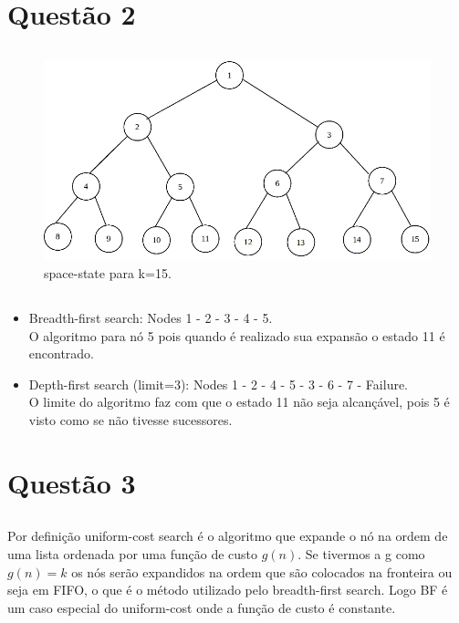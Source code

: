 \documentclass[a4paper,12pt]{article}
\begin{document}
\section{Questão 2}
\subsection{}
\begin{figure}[h!]
\includegraphics[width=\linewidth]{state1.jpg}
  \caption{space-state para k=15.}
  \label{fig:state1}
\end{figure} 
\subsection{}
\begin{itemize}
\item Breadth-first search: Nodes 1 - 2 - 3 - 4 - 5. \\
O algoritmo para nó 5 pois quando é realizado sua expansão o estado 11 é encontrado.
\item Depth-first search (limit=3): Nodes  1 - 2 - 4 - 5 - 3 - 6 - 7 - Failure.\\
O limite do algoritmo faz com que o estado 11 não seja alcançável, pois 5 é visto como se não tivesse sucessores.  
\end{itemize}
\section{Questão 3}
\subsection{}
Por definição uniform-cost search é o algoritmo que expande o nó na ordem de uma lista ordenada por uma função de custo $g(n)$. Se tivermos a g como $g(n)=k$ os nós serão expandidos na ordem que são colocados na fronteira ou seja em FIFO, o que é o método utilizado pelo breadth-first search. Logo BF é um caso especial do uniform-cost onde a função de custo é constante.
\end{document}
